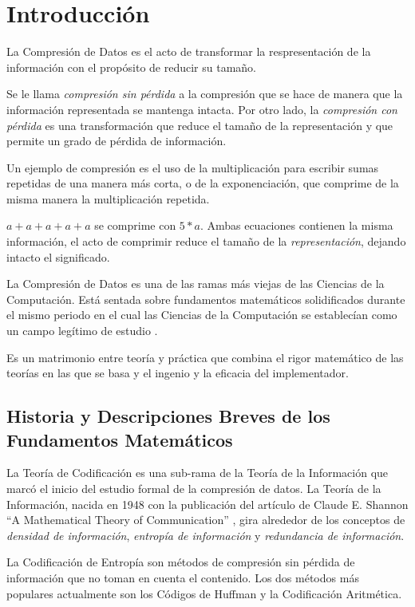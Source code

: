 \chapter{Introducción}\label{ch:introduction}


La Compresión de Datos es el acto de transformar la respresentación de la información con el propósito de reducir su tamaño.

Se le llama \emph{compresión sin pérdida} a la compresión que se hace de manera que la información representada se mantenga intacta. Por otro lado, la \emph{compresión con pérdida} es una transformación que reduce el tamaño de la representación y que permite un grado de pérdida de información.

Un ejemplo de compresión es el uso de la multiplicación para escribir sumas repetidas de una manera más corta, o de la exponenciación, que comprime de la misma manera la multiplicación repetida.

$ a + a + a + a + a $ se comprime con $ 5 * a $. Ambas ecuaciones contienen la misma información, el acto de comprimir reduce el tamaño de la \emph{representación}, dejando intacto el significado.

La Compresión de Datos es una de las ramas más viejas de las Ciencias de la Computación. Está sentada sobre fundamentos matemáticos solidificados durante el mismo periodo en el cual las Ciencias de la Computación se establecían como un campo legítimo de estudio \citep{cs_the_discipline}.

Es un matrimonio entre teoría y práctica que combina el rigor matemático de las teorías en las que se basa y el ingenio y la eficacia del implementador.

\section{Historia y Descripciones Breves de los Fundamentos Matemáticos}

La Teoría de Codificación es una sub-rama de la Teoría de la Información que marcó el inicio del estudio formal de la compresión de datos. La Teoría de la Información, nacida en 1948 con la publicación del artículo de Claude E. Shannon ``A Mathematical Theory of Communication'' \citep{shannon}, gira alrededor de los conceptos de \emph{densidad de información}, \emph{entropía de información} y \emph{redundancia de información}.

La Codificación de Entropía son métodos de compresión sin pérdida de información que no toman en cuenta el contenido. Los dos métodos más populares actualmente son los Códigos de Huffman y la Codificación Aritmética.

